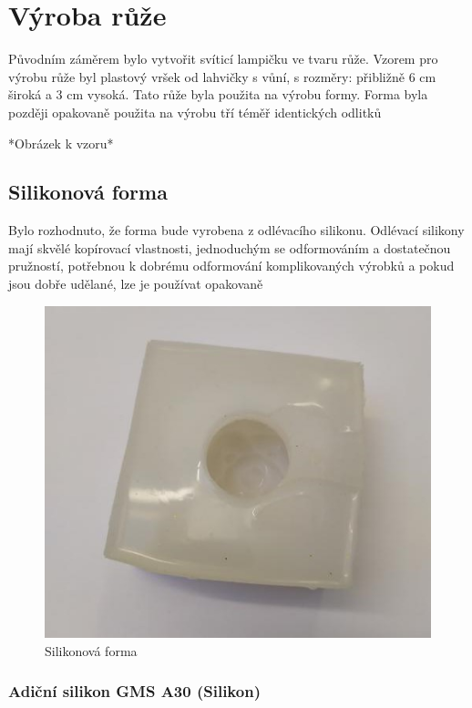 \chapter{Výroba růže}
Původním záměrem bylo vytvořit svíticí lampičku ve tvaru růže. Vzorem pro výrobu růže byl plastový vršek od lahvičky s vůní, s rozměry: přibližně 6 cm široká a 3 cm vysoká. Tato růže byla použita na výrobu formy. Forma byla později opakovaně použita na výrobu tří téměř identických odlitků

*Obrázek k vzoru*


\section{Silikonová forma}

Bylo rozhodnuto, že forma bude vyrobena z odlévacího silikonu. Odlévací silikony mají skvělé kopírovací vlastnosti, jednoduchým se odformováním a dostatečnou pružností, potřebnou k dobrému odformování komplikovaných výrobků a pokud jsou dobře udělané, lze je používat opakovaně



\begin{figure}[htbp]
	\centering
	\includegraphics[width=0.5
	\textwidth]{img/05 odl/Silicone mold.jpg}
	\caption{Silikonová forma}
\end{figure}
 


\subsection{Adiční silikon GMS A30 (Silikon)}


